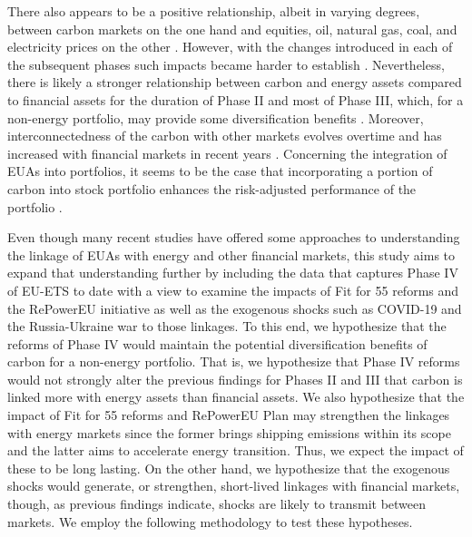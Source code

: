 \documentclass[preprint, 3p,
authoryear]{elsarticle} %
\begin{document}
There also appears to be a positive relationship, albeit in varying
degrees, between carbon markets on the one hand and equities, oil,
natural gas, coal, and electricity prices on the other
\citep{mansanet-bataller_co_2007, alberola_price_2008, keppler_causalities_2010, bredin_emerging_2011, chevallier_evaluating_2011, creti_carbon_2012, aatola_price_2013, zhang_dynamic_2016, ji_information_2018, falbo_renewables_2019, fiori_energy_2024}.
However, with the changes introduced in each of the subsequent phases
such impacts became harder to establish
\citep{arouri_nonlinearities_2012, wu_market-linkage_2020}.
Nevertheless, there is likely a stronger relationship between carbon and
energy assets compared to financial assets for the duration of Phase II
and most of Phase III, which, for a non-energy portfolio, may provide
some diversification benefits
\citep{tan_how_2020, lovcha_determinants_2022, yang_idiosyncratic_2022}.
Moreover, interconnectedness of the carbon with other markets evolves
overtime and has increased with financial markets in recent years
\citep{jimenez-rodriguez_what_2019, tan_how_2020, dong_risk_2024}.
Concerning the integration of EUAs into portfolios, it seems to be the
case that incorporating a portion of carbon into stock portfolio
enhances the risk-adjusted performance of the portfolio
\citep{demiralay_carbon_2022}.

Even though many recent studies have offered some approaches to
understanding the linkage of EUAs with energy and other financial
markets, this study aims to expand that understanding further by
including the data that captures Phase IV of EU-ETS to date with a view
to examine the impacts of Fit for 55 reforms and the RePowerEU
initiative as well as the exogenous shocks such as COVID-19 and the
Russia-Ukraine war to those linkages. To this end, we hypothesize that
the reforms of Phase IV would maintain the potential diversification
benefits of carbon for a non-energy portfolio. That is, we hypothesize
that Phase IV reforms would not strongly alter the previous findings for
Phases II and III that carbon is linked more with energy assets than
financial assets. We also hypothesize that the impact of Fit for 55
reforms and RePowerEU Plan may strengthen the linkages with energy
markets since the former brings shipping emissions within its scope and
the latter aims to accelerate energy transition. Thus, we expect the
impact of these to be long lasting. On the other hand, we hypothesize
that the exogenous shocks would generate, or strengthen, short-lived
linkages with financial markets, though, as previous findings indicate,
shocks are likely to transmit between markets. We employ the following
methodology to test these hypotheses.
\end{document}
